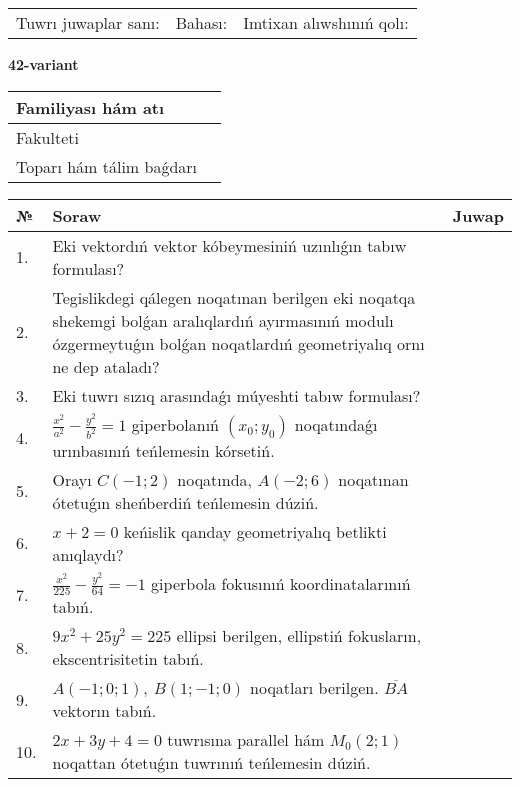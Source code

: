 \documentclass{article}
\begin{document}
\vspace{1cm}

\begin{tabular}{lll}
Tuwrı juwaplar sanı: \underline{\hspace{1.5cm}} & 
Bahası: \underline{\hspace{1.5cm}} & 
Imtixan alıwshınıń qolı: \underline{\hspace{2cm}} \\
\end{tabular}

\egroup

\newpage


\textbf{42-variant}\\

\bgroup
\def\arraystretch{1.6} %

\begin{tabular}{|m{5.7cm}|m{9.5cm}|}
\hline
Familiyası hám atı & \\
\hline
Fakulteti  & \\
\hline
Toparı hám tálim baǵdarı  & \\
\hline
\end{tabular}

\vspace{1cm}

\begin{tabular}{|m{0.7cm}|m{10cm}|m{4cm}|}
\hline
№ & Soraw & Juwap \\
\hline
1. & Eki vektordıń vektor kóbeymesiniń uzınlıǵın tabıw formulası? &  \\
\hline
2. & Tegislikdegi qálegen noqatınan berilgen eki noqatqa shekemgi bolǵan aralıqlardıń ayırmasınıń modulı ózgermeytuǵın bolǵan noqatlardıń geometriyalıq ornı ne dep ataladı? &  \\
\hline
3. & Eki tuwrı sızıq arasındaǵı múyeshti tabıw formulası? &  \\
\hline
4. & $\frac{x^2}{a^2}-\frac{y^2}{b^2}=1$ giperbolanıń $(x_0;y_0)$ noqatındaǵı urınbasınıń teńlemesin kórsetiń. &  \\
\hline
5. & Orayı $C (-1;2)$ noqatında, $A (-2;6 )$ noqatınan ótetuǵın sheńberdiń teńlemesin dúziń. &  \\
\hline
6. & $x+2=0$ keńislik qanday geometriyalıq betlikti anıqlaydı? &  \\
\hline
7. & $\frac{x^{2}}{225}-\frac{y^{2}}{64}=-1$ giperbola fokusınıń koordinatalarınıń tabıń. &  \\
\hline
8. & $9x^{2}+25y^{2}=225$ ellipsi berilgen, ellipstiń fokusların, ekscentrisitetin tabıń. &  \\
\hline
9. & $A (-1;0;1),\ B (1;-1;0)$ noqatları berilgen. $\overline{BA}$ vektorın tabıń. &  \\
\hline
10. & $2x+3y+4=0$ tuwrısına parallel hám $M_{0} (2;1)$ noqattan ótetuǵın tuwrınıń teńlemesin dúziń. &  \\
\hline
\end{tabular}
\end{document}
